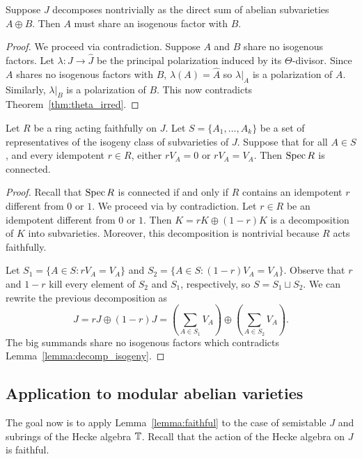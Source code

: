\documentclass[11pt, proquest]{uwthesis}
\begin{document}
\begin{lemma}
    \label{lemma:decomp_isogeny}
    Suppose $J$ decomposes nontrivially as the direct sum of abelian subvarieties
    $A\oplus B$. Then $A$ must share an isogenous factor with $B$.
\end{lemma}
\begin{proof}
    We proceed via contradiction. Suppose $A$ and $B$ share no isogenous
    factors. Let $\lambda:J\to \hat{J}$ be the principal polarization induced
    by its $\Theta$-divisor. Since $A$ shares no isogenous factors with $B$,
    $\lambda(A)=\hat{A}$ so $\lambda|_A$ is a polarization of $A$. Similarly,
    $\lambda|_B$ is a polarization of $B$. This now contradicts
    Theorem~\ref{thm:theta_irred}.
\end{proof}

\begin{lemma}
    \label{lemma:faithful}
    Let $R$ be a ring acting faithfully on $J$. Let $S=\{A_1,\ldots,A_k\}$ be a
    set of representatives of the isogeny class of subvarieties of $J$. 
    Suppose that for all $A\in S$, and every idempotent $r\in R$, either
    $rV_A=0$ or $rV_A=V_A$. Then $\operatorname{Spec} R$ is connected.
\end{lemma}
\begin{proof}
    Recall that $\operatorname{Spec} R$ is connected if and only if $R$ contains an
    idempotent $r$ different from $0$ or $1$. We proceed via by contradiction. 
    Let $r\in R$ be an idempotent different from $0$ or $1$. Then $K = rK
    \oplus (1-r) K$ is a decomposition of $K$ into subvarieties. Moreover, this
    decomposition is nontrivial because $R$ acts faithfully.
    
    Let $S_1=\{A\in S:rV_A=V_A\}$ and $S_2=\{A\in S:(1-r)V_A=V_A\}$. Observe
    that $r$ and $1-r$ kill every element of $S_2$ and $S_1$, respectively, so
    $S=S_1\sqcup S_2$. We can rewrite the previous decomposition as
    \[
        J 
        = rJ \oplus (1-r)J
        = \left(\sum_{A\in S_1} V_A \right)
        \oplus \left(\sum_{A\in S_2} V_A \right).
    \]
    The big summands share no isogenous factors which contradicts
    Lemma~\ref{lemma:decomp_isogeny}.
\end{proof}

\subsection{Application to modular abelian varieties}

The goal now is to apply Lemma~\ref{lemma:faithful} to the case of semistable
$J$ and subrings of the Hecke algebra $\mathbb{T}$. Recall that the action of the
Hecke algebra on $J$ is faithful.
\end{document}
